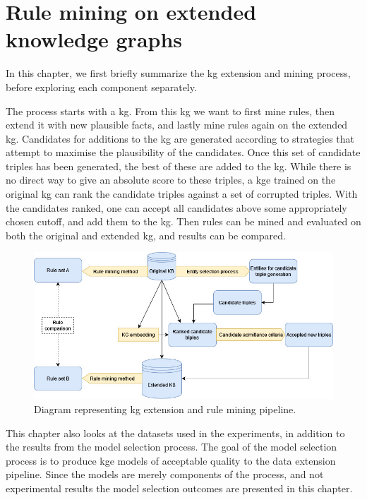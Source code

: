 \chapter{Rule mining on extended knowledge graphs}
In this chapter, we first briefly summarize the \gls{kg} extension and mining process, before exploring each component separately.

The process starts with a \gls{kg}. From this \gls{kg} we want to first mine rules, then extend it with new plausible facts, and lastly mine rules again on the extended \gls{kg}. Candidates for additions to the \gls{kg} are generated according to strategies that attempt to maximise the plausibility of the candidates. Once this set of candidate triples has been generated, the best of these are added to the \gls{kg}. While there is no direct way to give an absolute score to these triples, a \gls{kge} trained on the original \gls{kg} can rank the candidate triples against a set of corrupted triples. With the candidates ranked, one can accept all candidates above some appropriately chosen cutoff, and add them to the \gls{kg}. Then rules can be mined and evaluated on both the original and extended \gls{kg}, and results can be compared.

\begin{figure}[htp]
    \centering
    \includegraphics[width=16cm]{figures/ontology_mining_pipeline.jpg}
    \caption[Experiment pipeline diagram.]{Diagram representing \gls{kg} extension and rule mining pipeline.}
\end{figure}

This chapter also looks at the datasets used in the experiments, in addition to the results from the model selection process. The goal of the model selection process is to produce \gls{kge} models of acceptable quality to the data extension pipeline. Since the models are merely components of the process, and not experimental results the model selection outcomes are presented in this chapter.


